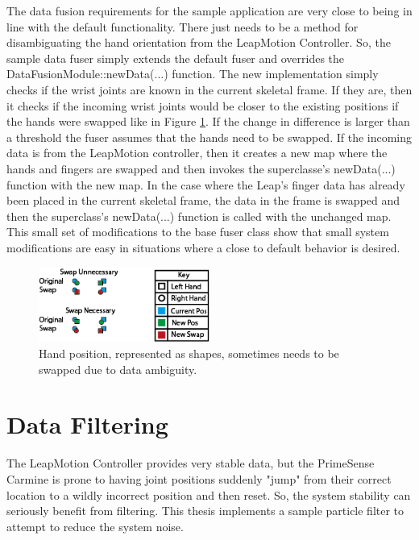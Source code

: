 The data fusion requirements for the sample application are very close to being in line with the default functionality. There just needs to be a method for disambiguating the hand orientation from the LeapMotion Controller. So, the sample data fuser simply extends the default fuser and overrides the DataFusionModule::newData(...) function. The new implementation simply checks if the wrist joints are known in the current skeletal frame. If they are, then it checks if the incoming wrist joints would be closer to the existing positions if the hands were swapped like in Figure \ref{fig:hand_swap}. If the change in difference is larger than a threshold the fuser assumes that the hands need to be swapped. If the incoming data is from the LeapMotion controller, then it creates a new map where the hands and fingers are swapped and then invokes the superclasse's newData(...) function with the new map. In the case where the Leap's finger data has already been placed in the current skeletal frame, the data in the frame is swapped and then the superclass's newData(...) function is called with the unchanged map. This small set of modifications to the base fuser class show that small system modifications are easy in situations where a close to default behavior is desired.

\begin{figure}[]
\centering
\includegraphics[width=0.5\textwidth]{figures/handSwap}
\caption{Hand position, represented as shapes, sometimes needs to be swapped due to data ambiguity.}
\label{fig:hand_swap}
\end{figure}

\section{Data Filtering}

The LeapMotion Controller provides very stable data, but the PrimeSense Carmine is prone to having joint positions suddenly "jump" from their correct location to a wildly incorrect position and then reset. So, the system stability can seriously benefit from filtering. This thesis implements a sample particle filter to attempt to reduce the system noise.

